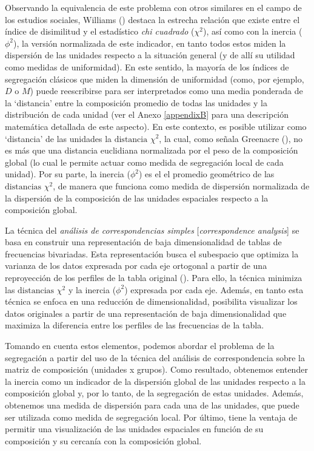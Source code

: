 \documentclass[
  spanish,
  a4paper,%
  chapterprefix=true,%
  DIV=calc,%
  twoside]{scrbook}%
\begin{document}
Observando la equivalencia de este problema con otros similares en el
campo de los estudios sociales, Williams () destaca la estrecha
relación que existe entre el índice de disimilitud y el estadístico \emph{chi
cuadrado} (\(\chi^2\)), así como con la inercia (\(\phi^2\)), la versión
normalizada de este indicador, en tanto todos estos miden la dispersión
de las unidades respecto a la situación general (y de allí su utilidad
como medidas de uniformidad). En este sentido, la mayoría de los índices
de segregación clásicos que miden la dimensión de uniformidad (como, por
ejemplo, \(D\) o \(M\)) puede reescribirse para ser interpretados como una
media ponderada de la `distancia' entre la composición promedio de todas
las unidades y la distribución de cada unidad (ver el Anexo
\ref{appendixB} para una descripción matemática detallada de este
aspecto). En este contexto, es posible utilizar como `distancia' de las
unidades la \(\text{distancia } \chi^2\), la cual, como señala
Greenacre (), no es más que una distancia euclidiana normalizada por
el peso de la composición global (lo cual le permite actuar como medida
de segregación local de cada unidad). Por su parte, la inercia
(\(\phi^2\)) es el el promedio geométrico de las
\(\text{distancias } \chi^2\), de manera que funciona como medida de
dispersión normalizada de la dispersión de la composición de las
unidades espaciales respecto a la composición global.

La técnica del \emph{análisis de correspondencias simples} {[}\emph{correspondence
analysis}{]} se basa en construir una representación de baja
dimensionalidad de tablas de frecuencias bivariadas. Esta representación
busca el subespacio que optimiza la varianza de los datos expresada por
cada eje ortogonal a partir de una reproyección de los perfiles de la
tabla original (). Para ello, la técnica minimiza las
\(\text{distancias } \chi^2\) y la inercia (\(\phi^2\)) expresada por cada
eje. Además, en tanto esta técnica se enfoca en una reducción de
dimensionalidad, posibilita visualizar los datos originales a partir de
una representación de baja dimensionalidad que maximiza la diferencia
entre los perfiles de las frecuencias de la tabla.

Tomando en cuenta estos elementos, podemos abordar el problema de la
segregación a partir del uso de la técnica del análisis de
correspondencia sobre la matriz de composición (unidades x grupos). Como
resultado, obtenemos entender la inercia como un indicador de la
dispersión global de las unidades respecto a la composición global y,
por lo tanto, de la segregación de estas unidades. Además, obtenemos una
medida de dispersión para cada una de las unidades, que puede ser
utilizada como medida de segregación local. Por último, tiene la ventaja
de permitir una visualización de las unidades espaciales en función de
su composición y su cercanía con la composición global.
\end{document}
